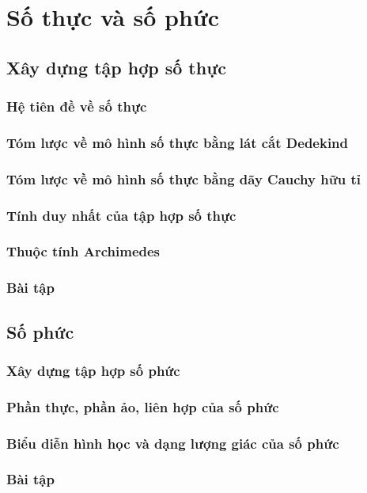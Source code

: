 \chapter{Số thực và số phức}\label{chapter:real-and-complex-numbers}

\section{Xây dựng tập hợp số thực}

\subsection{Hệ tiên đề về số thực}

\subsection{Tóm lược về mô hình số thực bằng lát cắt Dedekind}

\subsection{Tóm lược về mô hình số thực bằng dãy Cauchy hữu tỉ}

\subsection{Tính duy nhất của tập hợp số thực}

\subsection{Thuộc tính Archimedes}

\subsection{Bài tập}

\section{Số phức}

\subsection{Xây dựng tập hợp số phức}

\subsection{Phần thực, phần ảo, liên hợp của số phức}

\subsection{Biểu diễn hình học và dạng lượng giác của số phức}

\subsection{Bài tập}

